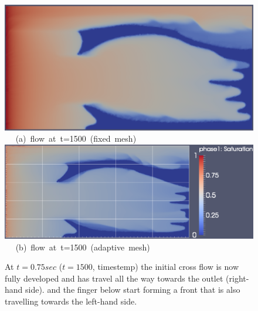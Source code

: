 \begin{landscape}
\begin{figure}[ht] 
\vbox{
\hbox{\hspace{3.5cm}
\includegraphics[width=.65\textwidth]{./Pics1/mr10_5regions_fixed/5regions_fixed_1500.pdf} 
}
\vspace{0.0cm}
\hbox{\hspace{6.5cm} (a) flow at t=1500 (fixed mesh)   
}
\vspace{0.25cm}
\hbox{\hspace{3.5cm}
\includegraphics[width=.9\textwidth]{./Pics1/mr10_5regions_adapt/5regions_adapt_1500_1.pdf}
}
\vspace{0.0cm}
\hbox{\hspace{6.5cm} (b) flow at t=1500 (adaptive mesh)     
}
}     
\caption{At $t=0.75 sec$ ($t=1500$, timestemp) the initial cross flow is now fully developed and has travel all the way towards the outlet (right-hand side). and the finger below start forming a front that is also travelling towards the left-hand side.}
\label{fig:2testcase_c}
\end{figure}
\end{landscape}
\clearpage



